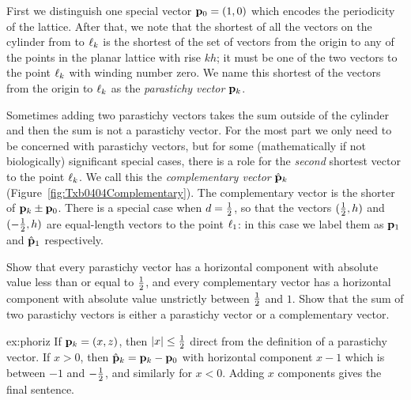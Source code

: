 First we distinguish one special vector ${\mathbf p}_{0}=(1,0)$ which encodes the periodicity of the lattice. After that, we note that the shortest of all the vectors on the cylinder from  to $\ell_{{k}}$ is the shortest of the set of vectors from the origin to any of the points in the planar lattice with rise $kh$; it must be one of the two vectors to the point $\ell_{{k}}$ with winding number zero. 
We name this shortest of the vectors from the origin to $\ell_{{k}}$ as  the \textit{parastichy vector} ${\mathbf p}_{k}$.

Sometimes adding two parastichy vectors takes the sum outside of the cylinder and then the sum is not a parastichy vector. For the most part we only need to be concerned with parastichy vectors, but for some (mathematically if not biologically)  significant special cases,  there is a role for the \textit{second} shortest vector to the point $\ell_{{k}}$. We call this the \emph{complementary vector} $\hat{\mathbf p}_{k}$ (Figure~\ref{fig:Txb0404Complementary}). The complementary vector is the shorter of ${\mathbf p}_{k}\pm {\mathbf p}_{0}$. There is a  special case when $d=\textstyle{\frac{1}{2}}$, so that the vectors $(\textstyle{\frac{1}{2}},h)$ and $(-\textstyle{\frac{1}{2}},h)$ are equal-length vectors to the point $\ell_{{1}}$: in this case we label them as ${\mathbf p}_{1}$ and $\hat{\mathbf p}_{1}$ respectively.



\begin{jExercise}\label{ex:phoriz}
	Show that every parastichy vector has a horizontal component with absolute value less than or equal to $\textstyle{\frac{1}{2}}$, and every complementary vector has a horizontal component with absolute value unstrictly between $\textstyle{\frac{1}{2}}$ and $1$. Show that the sum of two parastichy vectors is either a parastichy vector or a complementary vector. 
\end{jExercise}
\begin{jAnswer}{ex:phoriz}{
	If ${\mathbf p}_{k}=(x,z)$, then $|x|\leq\textstyle{\frac{1}{2}}$ direct from the definition of a parastichy vector.
	If $x>0$, then $\hat{\mathbf p}_{k}={\mathbf p}_{k}- {\mathbf p}_{0}$ with 
	horizontal component $x-1$ which is between $-1$ and $-\textstyle{\frac{1}{2}}$, and similarly for $x<0$. 
	Adding $x$ components gives the final sentence. 
}\end{jAnswer}


